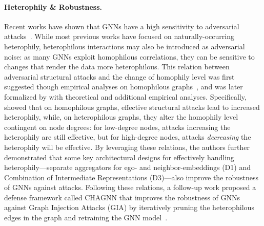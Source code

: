 \paragraph{Heterophily \& Robustness.}
Recent works have shown that GNNs have a high sensitivity to adversarial attacks~\cite{zugner2018adversarial,dai2018adversarial,xu2019topology,wu2019adversarial,li2020adversarial,ma2020towards}. While most previous works have focused on naturally-occurring heterophily, heterophilous interactions may also be introduced as adversarial noise: 
as many GNNs exploit homophilous correlations, they can be sensitive to changes that render the data more heterophilous. 
This relation between adversarial structural attacks and the change of homophily level was first suggested though empirical analyses on homophilous graphs~\cite{wu2019adversarial,jin2020adversarial}, and was later formalized by \citet{zhu2022heterophily} with theoretical and additional empirical analyses. Specifically, \citet{zhu2022heterophily} showed that on homophilous graphs, effective structural attacks lead to increased heterophily, while, on heterophilous graphs, they alter the homophily level contingent on node degrees: 
for low-degree nodes, attacks increasing the heterophily are still effective, but 
for high-degree nodes, attacks \emph{decreasing} the heterophily will be effective. 
By leveraging these relations, the authors further demonstrated that some key architectural designs for effectively handling heterophily---separate aggregators 
for ego- and neighbor-embeddings (D1) and Combination of Intermediate Representations (D3)---also improve the robustness of GNNs against attacks. 
Following these relations, a follow-up work proposed a defense framework called CHAGNN that improves the robustness of GNNs against Graph Injection Attacks (GIA) by iteratively pruning the heterophilous edges in the graph and retraining the GNN model~\cite{zhu2023resisting}.

